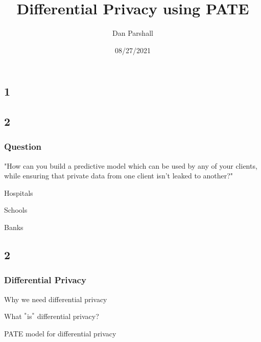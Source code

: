 \documentclass[xor=table]{beamer}
\title[PATE for Differential Privacy]{{\Huge Differential Privacy using PATE\\}}
\subtitle{
\color{Dblue}{
"Semi-supervised knowledge transfer for deep learning from private training data", 
by Papernot, et al. https://arxiv.org/pdf/1610.05755.pdf}}
\author[Dan Parshall Ph.D.]{Dan Parshall}
\date[08/27/2021]{08/27/2021}
\def\itemsymbol{\textbullet}
\let\svpar\par
\let\svitemize\itemize
\let\svenditemize\enditemize
\let\svitem\item
\let\svcenter\center
\let\svendcenter\endcenter
\let\svcolumn\column
\let\svendcolumn\endcolumn
\def\newitem{\renewcommand\item[1][\itemsymbol]{\vfill\svitem[##1]}}%
\def\newpar{\def\par{\svpar\vfill}}%
\newcommand\stretchon{%
  \newpar%
  \renewcommand\item[1][\itemsymbol]{\svitem[##1]\newitem}%
  \renewenvironment{itemize}%
    {\svitemize}{\svenditemize\newpar\par}%
  \renewenvironment{center}%
    {\svcenter\newpar}{\svendcenter\newpar}%
  \renewenvironment{column}[2]%
    {\svcolumn{##1}\setlength{\parskip}{\columnskip}##2}%
    {\svendcolumn\vspace{\columnskip}}%
}
\newcommand\stretchoff{%
  \let\par\svpar%
  \let\item\svitem%
  \let\itemize\svitemize%
  \let\enditemize\svenditemize%
  \let\center\svcenter%
  \let\endcenter\svendcenter%
  \let\column\svcolumn%
  \let\endcolumn\svendcolumn%
}
\begin{document}
\stretchoff

\subsection*{1}
\begin{frame}
\titlepage
\end{frame} 

\subsection*{2}
\stretchon


\begin{frame}

\frametitle{Question}

"How can you build a predictive model which can be used by any of your clients, while ensuring that private data from one client isn't leaked to another?"

\pause

\begin{itemize}
	\item Hospitals
	\item Schools
	\item Banks
\end{itemize}

\end{frame}



\subsection*{2}
\stretchon


\begin{frame}

\frametitle{Differential Privacy}

\begin{itemize}
	\item Why we need differential privacy
	\item What $^*$is$^*$ differential privacy?
	\item PATE model for differential privacy
\end{itemize}


\end{frame}
\end{document}
